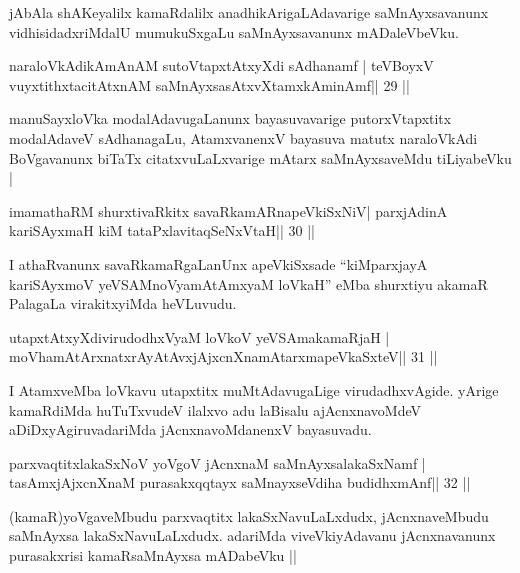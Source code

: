\begin{artha}
jAbAla shAKeyalilx kamaRdalilx anadhikArigaLAdavarige saMnAyxsavanunx vidhisidadxriMdalU mumukuSxgaLu saMnAyxsavanunx mADaleVbeVku.
\end{artha}

\begin{shl}
naraloVkAdikAmAnAM sutoVtapxtAtxyXdi sAdhanamf |
teVBoyxV vuyxtithxtacitAtxnAM saMnAyxsasAtxvXtamxkAminAmf\hfill || 29 ||
\end{shl}

\begin{artha}
manuSayxloVka modalAdavugaLanunx bayasuvavarige putorxVtapxtitx
modalAdaveV sAdhanagaLu, AtamxvanenxV bayasuva matutx naraloVkAdi
BoVgavanunx biTaTx citatxvuLaLxvarige mAtarx saMnAyxsaveMdu
tiLiyabeVku |
\end{artha}

\begin{shl}
imamathaRM shurxtivaRkitx savaRkamARnapeVkiSxNiV|
parxjAdinA kariSAyxmaH kiM tataPxlavitaqSeNxVtaH\hfill || 30 ||
\end{shl}

\begin{artha}
I athaRvanunx savaRkamaRgaLanUnx apeVkiSxsade ``kiMparxjayA kariSAyxmoV yeVSAMnoV\s yamAtAmxyaM loVkaH'' eMba shurxtiyu akamaR PalagaLa virakitxyiMda  heVLuvudu.
\end{artha}


\begin{shl}
utapxtAtxyXdivirudodhxV\s yaM loVkoV yeVSAmakamaRjaH |
moVhamAtArxnatxrAyAtAvxjAjxcnXnamAtarxmapeVkaSxteV\hfill || 31 ||
\end{shl}

\begin{artha}
I AtamxveMba loVkavu utapxtitx muMtAdavugaLige virudadhxvAgide. yArige kamaRdiMda huTuTxvudeV ilalxvo adu laBisalu ajAcnxnavoMdeV aDiDxyAgiruvadariMda jAcnxnavoMdanenxV bayasuvadu.
\end{artha}


\begin{shl}
parxvaqtitxlakaSxNoV yoVgoV jAcnxnaM saMnAyxsalakaSxNamf |
tasAmxjAjxcnXnaM purasakxqqtayx saMnayxseVdiha budidhxmAnf\hfill || 32 ||
\end{shl}

\begin{artha}
(kamaR)yoVgaveMbudu parxvaqtitx lakaSxNavuLaLxdudx, jAcnxnaveMbudu
  saMnAyxsa lakaSxNavuLaLxdudx. adariMda viveVkiyAdavanu jAcnxnavanunx
  purasakxrisi kamaRsaMnAyxsa mADabeVku || 
\end{artha}

